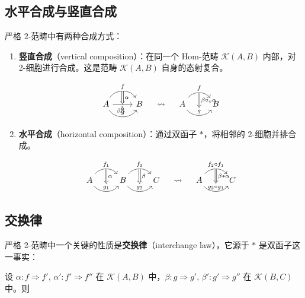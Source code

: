 \documentclass[UTF8,a4paper,12pt]{ctexart}
\theoremstyle{definition}
\theoremstyle{plain}
\newcommand{\cat}[1]{\mathcal{#1}}
\begin{document}
\subsection{水平合成与竖直合成}

严格 2-范畴中有两种合成方式：

\begin{enumerate}
  \item \textbf{竖直合成}（vertical composition）：在同一个 Hom-范畴 $\cat{K}(A,B)$ 内部，对 2-细胞进行合成。这是范畴 $\cat{K}(A,B)$ 自身的态射复合。
  
  \[
  \begin{tikzcd}
    A \ar[r,bend left=60,"f"{name=U}] \ar[r,"h"{name=M,below}] \ar[r,bend right=60,"g"{name=D}] &
    B
    \ar[Rightarrow,from=U,to=M,"\alpha"]
    \ar[Rightarrow,from=M,to=D,"\beta"]
  \end{tikzcd}
  \quad \leadsto \quad
  \begin{tikzcd}
    A \ar[r,bend left=50,"f"{name=U}] \ar[r,bend right=50,"g"{name=D}] &
    B
    \ar[Rightarrow,from=U,to=D,"\beta \circ_v \alpha"]
  \end{tikzcd}
  \]

  \item \textbf{水平合成}（horizontal composition）：通过双函子 $*$，将相邻的 2-细胞并排合成。
  
  \[
  \begin{tikzcd}
    A \ar[r,bend left=50,"f_1"{name=U1}] \ar[r,bend right=50,"g_1"{name=D1}] &
    B \ar[r,bend left=50,"f_2"{name=U2}] \ar[r,bend right=50,"g_2"{name=D2}] &
    C
    \ar[Rightarrow,from=U1,to=D1,"\alpha"]
    \ar[Rightarrow,from=U2,to=D2,"\beta"]
  \end{tikzcd}
  \quad \leadsto \quad
  \begin{tikzcd}
    A \ar[r,bend left=50,"f_2 \circ f_1"{name=U}] \ar[r,bend right=50,"g_2 \circ g_1"{name=D}] &
    C
    \ar[Rightarrow,from=U,to=D,"\beta * \alpha"]
  \end{tikzcd}
  \]
\end{enumerate}

\subsection{交换律}

严格 2-范畴中一个关键的性质是\textbf{交换律}（interchange law），它源于 $*$ 是双函子这一事实：

设 $\alpha : f \Rightarrow f'$, $\alpha' : f' \Rightarrow f''$ 在 $\cat{K}(A,B)$ 中，$\beta : g \Rightarrow g'$, $\beta' : g' \Rightarrow g''$ 在 $\cat{K}(B,C)$ 中。则
\end{document}
